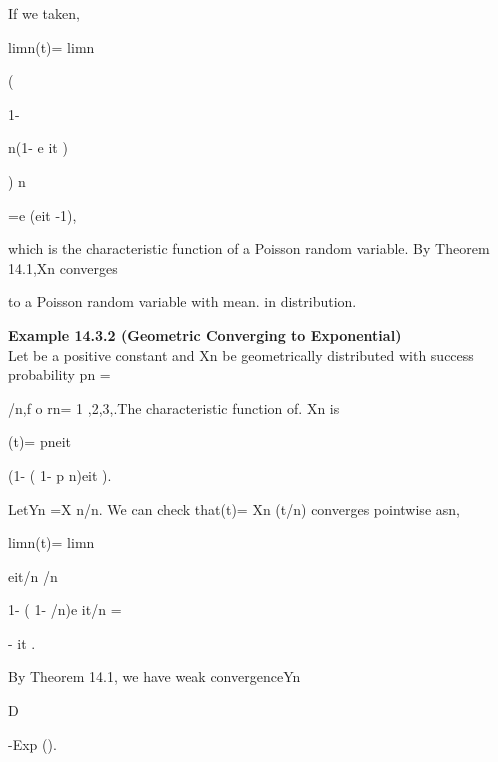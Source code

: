 If we taken\to\infty ,

limn\to\infty \phiXn (t)= limn\to\infty

(

1- \lambda

n(1- e it )

) n

=e \lambda(eit -1),

which is the characteristic function of a Poisson random variable. By Theorem 14.1,Xn converges

to a Poisson random variable with mean. \lambda in distribution.

\textbf{Example 14.3.2 (Geometric Converging to Exponential)} \\

Let \lambda be a positive constant and Xn be geometrically distributed with success probability pn =

\lambda/n,f o rn= 1 ,2,3,.The characteristic function of. Xn is

\phiXn (t)= pneit

(1- ( 1- p n)eit ).

LetYn =X n/n. We can check that\phiYn (t)= \phi Xn (t/n) converges pointwise asn\to\infty ,

limn\to\infty \phiYn (t)= limn\to\infty

eit/n \lambda/n

1- ( 1- \lambda/n)e it/n = \lambda

\lambda- it .

By Theorem 14.1, we have weak convergenceYn

D

-\to Exp (\lambda).
